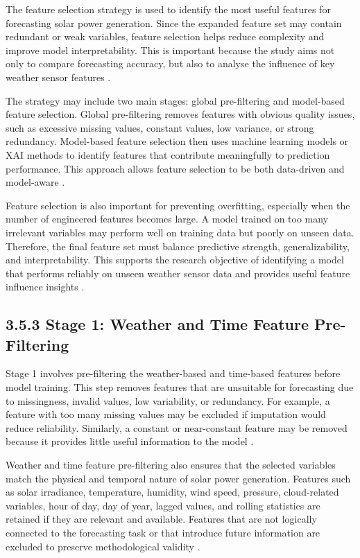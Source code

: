 The feature selection strategy is used to identify the most useful features for forecasting solar power generation. Since the expanded feature set may contain redundant or weak variables, feature selection helps reduce complexity and improve model interpretability. This is important because the study aims not only to compare forecasting accuracy, but also to analyse the influence of key weather sensor features \parencite{JnanaVarshitha2025, TsaiLo2025, Pongphaw2025}.

The strategy may include two main stages: global pre-filtering and model-based feature selection. Global pre-filtering removes features with obvious quality issues, such as excessive missing values, constant values, low variance, or strong redundancy. Model-based feature selection then uses machine learning models or XAI methods to identify features that contribute meaningfully to prediction performance. This approach allows feature selection to be both data-driven and model-aware \parencite{Bakht2025, CarvalhoJunior2025, Ma2025}.

Feature selection is also important for preventing overfitting, especially when the number of engineered features becomes large. A model trained on too many irrelevant variables may perform well on training data but poorly on unseen data. Therefore, the final feature set must balance predictive strength, generalizability, and interpretability. This supports the research objective of identifying a model that performs reliably on unseen weather sensor data and provides useful feature influence insights \parencite{Eren2025, ArellanosTafur2025, Duvuru2026}.

\subsection{3.5.3 Stage 1: Weather and Time Feature Pre-Filtering}

Stage 1 involves pre-filtering the weather-based and time-based features before model training. This step removes features that are unsuitable for forecasting due to missingness, invalid values, low variability, or redundancy. For example, a feature with too many missing values may be excluded if imputation would reduce reliability. Similarly, a constant or near-constant feature may be removed because it provides little useful information to the model \parencite{JnanaVarshitha2025, Duvuru2026, TsaiLo2025}.

Weather and time feature pre-filtering also ensures that the selected variables match the physical and temporal nature of solar power generation. Features such as solar irradiance, temperature, humidity, wind speed, pressure, cloud-related variables, hour of day, day of year, lagged values, and rolling statistics are retained if they are relevant and available. Features that are not logically connected to the forecasting task or that introduce future information are excluded to preserve methodological validity \parencite{CarvalhoJunior2025, Pongphaw2025, Eren2025}.

